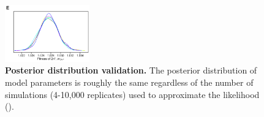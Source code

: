 \documentclass[12pt]{extarticle}
\begin{document}
\begin{figure}[h]
      \includegraphics[width=0.325\textwidth]{../figures/runs-E.pdf} 
       \caption{
    \textbf{Posterior distribution validation.}
    The posterior distribution of model parameters is roughly the same regardless of the number of simulations (4-10,000 replicates) used to approximate the likelihood ().
    } 
     
     \label{fig:seeds}
 \end{figure}
 
\end{document}
